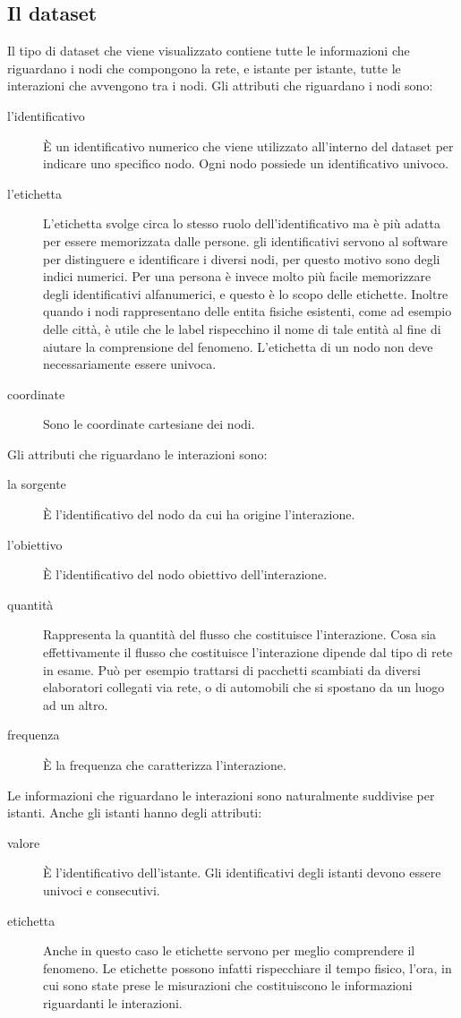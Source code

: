 \documentclass[a4paper,12pt]{article}
\begin{document}
\subsection{Il dataset}
Il tipo di dataset che viene visualizzato contiene tutte le informazioni che riguardano i nodi che compongono la rete, e istante per istante, tutte le interazioni che avvengono tra i nodi.
Gli attributi che riguardano i nodi sono:
\begin{description}
 \item[l'identificativo] \`E un identificativo numerico che viene utilizzato all'interno del dataset per indicare uno specifico nodo. Ogni nodo possiede un identificativo univoco.
 \item[l'etichetta] L'etichetta svolge circa lo stesso ruolo dell'identificativo ma \`e più adatta per essere memorizzata dalle persone. gli identificativi servono al software per distinguere e identificare i diversi nodi, per questo motivo sono degli indici numerici. Per una persona \`e invece molto più facile memorizzare degli identificativi alfanumerici, e questo \`e lo scopo delle etichette. Inoltre quando i nodi rappresentano delle entita fisiche esistenti, come ad esempio delle città, \`e utile che le label rispecchino il nome di tale entità al fine di aiutare la comprensione del fenomeno. L'etichetta di un nodo non deve necessariamente essere univoca.
 \item[coordinate] Sono le coordinate cartesiane dei nodi.
\end{description}

Gli attributi che riguardano le interazioni sono:
\begin{description}
 \item[la sorgente] \`E l'identificativo del nodo da cui ha origine l'interazione.
 \item[l'obiettivo] \`E l'identificativo del nodo obiettivo dell'interazione.
 \item[quantità] Rappresenta la quantità del flusso che costituisce l'interazione. Cosa sia effettivamente il flusso che costituisce l'interazione dipende dal tipo di rete in esame. Pu\`o per esempio trattarsi di pacchetti scambiati da diversi elaboratori collegati via rete, o di automobili che si spostano da un luogo ad un altro.
 \item[frequenza] \`E la frequenza che caratterizza l'interazione.
\end{description}

Le informazioni che riguardano le interazioni sono naturalmente suddivise per istanti. Anche gli istanti hanno degli attributi:
\begin{description}
 \item[valore] \`E l'identificativo dell'istante. Gli identificativi degli istanti devono essere univoci e consecutivi.
 \item[etichetta] Anche in questo caso le etichette servono per meglio comprendere il fenomeno. Le etichette possono infatti rispecchiare il tempo fisico, l'ora, in cui sono state prese le misurazioni che costituiscono le informazioni riguardanti le interazioni.
\end{description}
 
\end{document}
